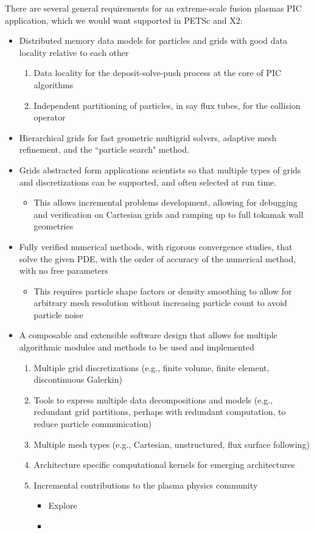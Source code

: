 \documentclass[review]{siamart}
\begin{document}
There are several general requirements for an extreme-scale fusion plasmas PIC application, which we would want supported in PETSc and X2:
\begin{itemize}
\item Distributed memory data models for particles and grids with good data locality relative to each other
\begin{enumerate}
\item Data locality for the deposit-solve-push process at the core of PIC algorithms
\item Independent partitioning of particles, in say flux tubes, for the collision operator
\end{enumerate}
\item Hierarchical grids for fast geometric multigrid solvers, adaptive mesh refinement, and the ``particle search" method.
\item Grids abstracted form applications scientists so that multiple types of grids and discretizations can be supported, and often selected at run time.
\begin{itemize}
\item This allows incremental problems development, allowing for debugging and verification on Cartesian grids and ramping up to full tokamak wall geometries 
\end{itemize}
\item Fully verified numerical methods, with rigorous convergence studies, that solve the given PDE, with the order of accuracy of the numerical method, with no free parameters
\begin{itemize}
\item This requires particle shape factors or density smoothing to allow for arbitrary mesh resolution without increasing particle count to avoid particle noise
\end{itemize}
\item A composable and extensible software design that allows for multiple algorithmic modules and methods to be used and implemented
\begin{enumerate}
\item Multiple grid discretizations (e.g., finite volume, finite element, discontinuous Galerkin)
\item Tools to express multiple data decompositions and models (e.g., redundant grid partitions, perhaps with redundant computation, to reduce particle communication)
\item Multiple mesh types (e.g., Cartesian, unstructured, flux surface following)
\item Architecture specific computational kernels for emerging architectures \cite{KnepleyBrownMcInnesSmithRuppAdams2015}
\item Incremental contributions to the plasma physics community
\begin{itemize}
\item Explore 
\item 
\end{itemize}
\end{enumerate}
\end{itemize}
\end{document}
